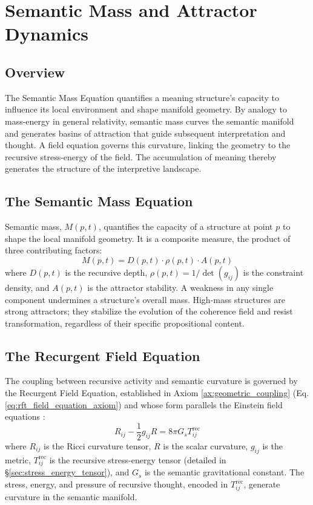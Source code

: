 \chapter{Semantic Mass and Attractor Dynamics}\label{ch:attractor_dynamics}

\section{Overview}

The Semantic Mass Equation quantifies a meaning structure's capacity to influence its local environment and shape manifold geometry. By analogy to mass-energy in general relativity, semantic mass curves the semantic manifold and generates basins of attraction that guide subsequent interpretation and thought. A field equation governs this curvature, linking the geometry to the recursive stress-energy of the field. The accumulation of meaning thereby generates the structure of the interpretive landscape.

\section{The Semantic Mass Equation}\label{sec:semantic_mass_equation}

Semantic mass, \(M(p,t)\), quantifies the capacity of a structure at point \(p\) to shape the local manifold geometry. It is a composite measure, the product of three contributing factors:
\begin{equation}
M(p, t) = D(p, t) \cdot \rho(p, t) \cdot A(p, t)
\end{equation}
where \(D(p, t)\) is the recursive depth, \(\rho(p, t) = 1/\det(g_{ij})\) is the constraint density, and \(A(p, t)\) is the attractor stability. A weakness in any single component undermines a structure's overall mass. High-mass structures are strong attractors; they stabilize the evolution of the coherence field and resist transformation, regardless of their specific propositional content.

\section{The Recurgent Field Equation}\label{sec:recurgent_field_equation}

The coupling between recursive activity and semantic curvature is governed by the Recurgent Field Equation, established in Axiom \ref{ax:geometric_coupling} (Eq. \ref{eq:rft_field_equation_axiom}) and whose form parallels the Einstein field equations \autocite{Einstein1915, MisnerThorneWheeler1973, Wald1984}:
\begin{equation}
R_{ij} - \frac{1}{2}g_{ij}R = 8\pi G_s T^{\text{rec}}_{ij}
\end{equation}
where \(R_{ij}\) is the Ricci curvature tensor, \(R\) is the scalar curvature, \(g_{ij}\) is the metric, \(T^{\text{rec}}_{ij}\) is the recursive stress-energy tensor (detailed in \S\ref{sec:stress_energy_tensor}), and \(G_s\) is the semantic gravitational constant. The stress, energy, and pressure of recursive thought, encoded in \(T^{\text{rec}}_{ij}\), generate curvature in the semantic manifold.

